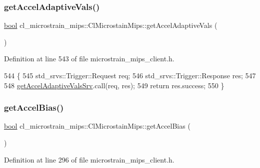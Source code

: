 \subsubsection{\texorpdfstring{get\+Accel\+Adaptive\+Vals()}{getAccelAdaptiveVals()}}
{\footnotesize\ttfamily \hyperlink{classbool}{bool} cl\+\_\+microstrain\+\_\+mips\+::\+Cl\+Microstain\+Mips\+::get\+Accel\+Adaptive\+Vals (\begin{DoxyParamCaption}{ }\end{DoxyParamCaption})\hspace{0.3cm}{\ttfamily [inline]}}



Definition at line 543 of file microstrain\+\_\+mips\+\_\+client.\+h.


\begin{DoxyCode}
544     \{
545         std\_srvs::Trigger::Request req;
546         std\_srvs::Trigger::Response res;
547 
548         \hyperlink{classcl__microstrain__mips_1_1ClMicrostainMips_a828f3b0adbfb1e6082fcaa1ce22928c0}{getAccelAdaptiveValsSrv}.call(req, res);
549         \textcolor{keywordflow}{return} res.success;
550     \}
\end{DoxyCode}
\mbox{\label{classcl__microstrain__mips_1_1ClMicrostainMips_a97ef55f8b10be52f44ae585ccd4e7db9}} 
\subsubsection{\texorpdfstring{get\+Accel\+Bias()}{getAccelBias()}}
{\footnotesize\ttfamily \hyperlink{classbool}{bool} cl\+\_\+microstrain\+\_\+mips\+::\+Cl\+Microstain\+Mips\+::get\+Accel\+Bias (\begin{DoxyParamCaption}{ }\end{DoxyParamCaption})\hspace{0.3cm}{\ttfamily [inline]}}



Definition at line 296 of file microstrain\+\_\+mips\+\_\+client.\+h.


